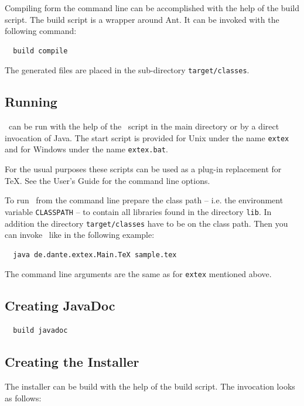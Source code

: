 \documentclass{extex-doc}
\newcommand\File[1]{\texttt{#1}}
\begin{document}
Compiling \ExTeX form the command line can be accomplished with the
help of the build script. The build script is a wrapper around Ant. It
can be invoked with the following command:

\begin{verbatim}
  build compile
\end{verbatim}

The generated files are placed in the sub-directory
\texttt{target/classes}. 


\subsection{Running \ExTeX}

\ExTeX\ can be run with the help of the \ExTeX\ script in the main
directory or by a direct invocation of Java. The start script is
provided for Unix under the name \File{extex} and for Windows under
the name \File{extex.bat}.

For the usual purposes these scripts can be used as a plug-in
replacement for \TeX. See the User's Guide for the command line
options.

To run \ExTeX\ from the command line prepare the class path -- i.e.
the environment variable \texttt{CLASSPATH} -- to contain all
libraries found in the directory \texttt{lib}. In addition the
directory \texttt{target/classes} have to be on the class path.
Then you can invoke \ExTeX\ like in the following example:

\begin{verbatim}
  java de.dante.extex.Main.TeX sample.tex
\end{verbatim}

The command line arguments are the same as for \File{extex} mentioned
above.


\subsection{Creating JavaDoc}


\begin{verbatim}
  build javadoc
\end{verbatim}

\INCOMPLETE



\subsection{Creating the Installer}

The installer can be build with the help of the build script. The
invocation looks as follows:
\end{document}
